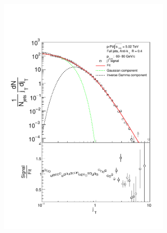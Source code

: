 \begin{figure}
\begin{subfigure}{0.24\textwidth}
\end{subfigure}
\begin{subfigure}{0.24\textwidth}
\includegraphics[width=0.95\textwidth]{results/JetConejTSignalFit/JetConejTSignalFitNFin00JetPt05perconeBgBayes}
\end{subfigure}
\begin{subfigure}{0.24\textwidth}

\end{subfigure}
\end{figure}
